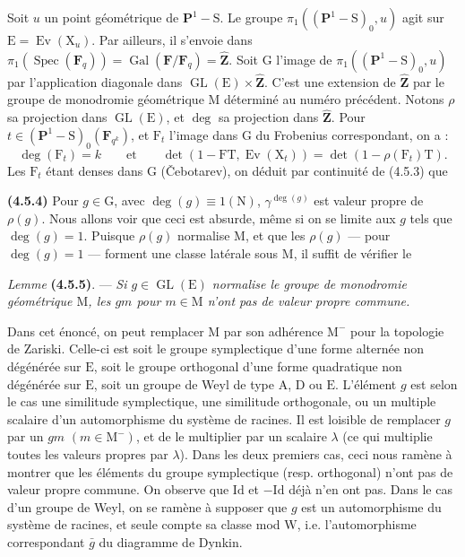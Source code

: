 \documentclass[11pt,leqno]{article}
\begin{document}
Soit \(u\) un point géométrique de \(\mathbf{P}^1-\mathrm{S}\). Le groupe \(\pi_1((\mathbf{P}^1-\mathrm{S})_0,u)\) agit sur \(\mathrm{E}=\operatorname{Ev}(\mathrm{X}_u)\). Par ailleurs, il s’envoie dans \(\pi_1(\operatorname{Spec}(\mathbf{F}_q))=\operatorname{Gal}(\mathbf{F}/\mathbf{F}_q)=\widehat{\mathbf{Z}}\). Soit \(\mathrm{G}\) l’image de \(\pi_1((\mathbf{P}^1-\mathrm{S})_0,u)\) par l’application diagonale dans \(\operatorname{GL}(\mathrm{E})\times\widehat{\mathbf{Z}}\). C’est une extension de \(\widehat{\mathbf{Z}}\) par le groupe de monodromie géométrique \(\mathrm{M}\) déterminé au numéro précédent. Notons \(\rho\) sa projection dans \(\operatorname{GL}(\mathrm{E})\), et \(\deg\) sa projection dans \(\widehat{\mathbf{Z}}\). Pour \(t\in(\mathbf{P}^1-\mathrm{S})_0(\mathbf{F}_{q^k})\), et \(\mathrm{F}_t\) l’image dans \(\mathrm{G}\) du Frobenius correspondant, on a :
\[
\deg(\mathrm{F}_t)=k
\qquad\text{et}\qquad
\det(1-\mathrm{F}\mathrm{T},\operatorname{Ev}(\mathrm{X}_t))
=\det(1-\rho(\mathrm{F}_t)\mathrm{T}).
\]
Les \(\mathrm{F}_t\) étant denses dans \(\mathrm{G}\) (\v{C}ebotarev), on déduit par continuité de (4.5.3) que

\textbf{(4.5.4)} Pour \(g\in\mathrm{G}\), avec \(\deg(g)\equiv1(\mathrm{N})\), \(\gamma^{\deg(g)}\) est valeur propre de \(\rho(g)\). Nous allons voir que ceci est absurde, même si on se limite aux \(g\) tels que \(\deg(g)=1\). Puisque \(\rho(g)\) normalise \(\mathrm{M}\), et que les \(\rho(g)\) — pour \(\deg(g)=1\) — forment une classe latérale sous \(\mathrm{M}\), il suffit de vérifier le

\textit{Lemme} \textbf{(4.5.5)}. — \textit{Si \(g\in\operatorname{GL}(\mathrm{E})\) normalise le groupe de monodromie géométrique \(\mathrm{M}\), les \(gm\) pour \(m\in\mathrm{M}\) n’ont pas de valeur propre commune.}

Dans cet énoncé, on peut remplacer \(\mathrm{M}\) par son adhérence \(\mathrm{M}^{-}\) pour la topologie de Zariski. Celle-ci est soit le groupe symplectique d’une forme alternée non dégénérée sur \(\mathrm{E}\), soit le groupe orthogonal d’une forme quadratique non dégénérée sur \(\mathrm{E}\), soit un groupe de Weyl de type \(\mathrm{A}\), \(\mathrm{D}\) ou \(\mathrm{E}\). L’élément \(g\) est selon le cas une similitude symplectique, une similitude orthogonale, ou un multiple scalaire d’un automorphisme du système de racines. Il est loisible de remplacer \(g\) par un \(gm\) \((m\in\mathrm{M}^{-})\), et de le multiplier par un scalaire \(\lambda\) (ce qui multiplie toutes les valeurs propres par \(\lambda\)). Dans les deux premiers cas, ceci nous ramène à montrer que les éléments du groupe symplectique (resp. orthogonal) n’ont pas de valeur propre commune. On observe que \(\mathrm{Id}\) et \(-\mathrm{Id}\) déjà n’en ont pas. Dans le cas d’un groupe de Weyl, on se ramène à supposer que \(g\) est un automorphisme du système de racines, et seule compte sa classe mod \(\mathrm{W}\), i.e. l’automorphisme correspondant \(\bar{g}\) du diagramme de Dynkin.
\end{document}
